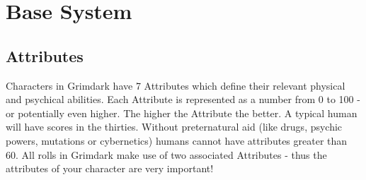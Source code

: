 \chapter{Base System}
\section{Attributes}\label{Attributes}
	Characters in Grimdark have 7 Attributes which define their relevant physical and psychical abilities.
	Each Attribute is represented as a number from 0 to 100 - or potentially even higher.
	The higher the Attribute the better.
	A typical human will have scores in the thirties.
	Without preternatural aid (like drugs, psychic powers, mutations or cybernetics) humans cannot have attributes greater than 60. 
	All rolls in Grimdark make use of two associated Attributes - thus the attributes of your character are very important!
